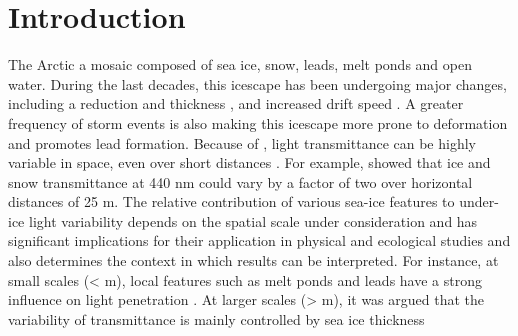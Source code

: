 \section{Introduction}

The Arctic \DIFdelbegin {}\DIFdelend \DIFaddbegin {}\DIFaddend a mosaic composed of sea ice, snow, leads, melt ponds and open water. During the last decades, this \DIFdelbegin {}\DIFdelend \DIFaddbegin {}\DIFaddend icescape has been undergoing major changes, including a reduction \DIFdelbegin {}\DIFdelend \DIFaddbegin {}\DIFaddend and thickness \citep{Meier2014}, and \DIFaddbegin {}\DIFaddend increased drift speed \citep{Kwok2013}. A greater frequency of storm events is also making this icescape more prone to deformation \citep{Itkin2017} and promotes lead formation. Because of \DIFdelbegin {}\DIFdelend \DIFaddbegin {}\DIFaddend , light transmittance can be highly variable in space, even over short distances \citep{Nicolaus2013b, Katlein2015, Hancke2018}. For example, \citet{Perovich1998} showed that \DIFaddbegin {}\DIFaddend ice and snow transmittance at 440 nm could vary by a factor of two over horizontal distances of 25 m. The relative contribution of various sea-ice features to under-ice light variability depends on the spatial scale under consideration and has significant implications for their application in physical and ecological studies and also determines the context in which results can be interpreted. For instance, at small scales (\textless\DIFaddbegin \DIFadd{~} m), local features such as melt ponds and leads have a strong influence on light penetration \DIFdelbegin {}\DIFdelend \citep{Frey2011, Katlein2016, Massicotte2018}. At larger scales (\textgreater\DIFaddbegin \DIFadd{~} m), it was argued that the variability of transmittance is mainly controlled by sea ice thickness \DIFdelbegin {}\DIFdelend \DIFaddbegin {}\DIFaddend 

